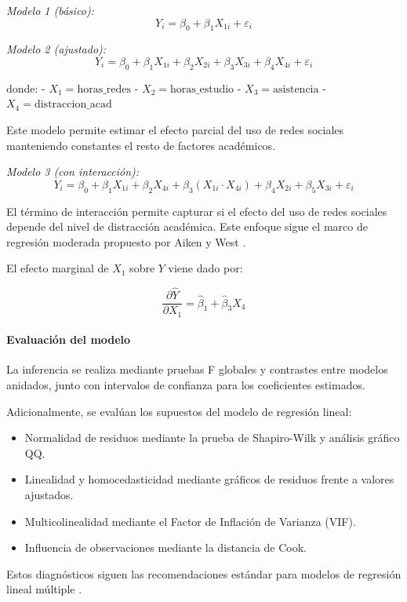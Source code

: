 \documentclass[12pt]{article}
\begin{document}
\textit{Modelo 1 (básico):}
\[
Y_i = \beta_0 + \beta_1 X_{1i} + \varepsilon_i
\]

\textit{Modelo 2 (ajustado):}
\[
Y_i = \beta_0 + \beta_1 X_{1i} + \beta_2 X_{2i} + \beta_3 X_{3i} + \beta_4 X_{4i} + \varepsilon_i
\]

donde:
- \(X_1 = \text{horas\_redes}\)
- \(X_2 = \text{horas\_estudio}\)
- \(X_3 = \text{asistencia}\)
- \(X_4 = \text{distraccion\_acad}\)

Este modelo permite estimar el efecto parcial del uso de redes sociales manteniendo constantes el resto de factores académicos.

\textit{Modelo 3 (con interacción):}
\[
Y_i = \beta_0 + \beta_1 X_{1i} + \beta_2 X_{4i} + \beta_3 (X_{1i} \cdot X_{4i}) + \beta_4 X_{2i} + \beta_5 X_{3i} + \varepsilon_i
\]

El término de interacción permite capturar si el efecto del uso de redes sociales depende del nivel de distracción académica. Este enfoque sigue el marco de regresión moderada propuesto por Aiken y West \cite{aikenwest1991}.

El efecto marginal de \(X_1\) sobre \(Y\) viene dado por:

\[
\frac{\partial \hat{Y}}{\partial X_1} = \hat\beta_1 + \hat\beta_3 X_4
\]

\paragraph{Evaluación del modelo}

La inferencia se realiza mediante pruebas F globales y contrastes entre modelos anidados, junto con intervalos de confianza para los coeficientes estimados.

Adicionalmente, se evalúan los supuestos del modelo de regresión lineal:

\begin{itemize}
\item Normalidad de residuos mediante la prueba de Shapiro-Wilk y análisis gráfico QQ.
\item Linealidad y homocedasticidad mediante gráficos de residuos frente a valores ajustados.
\item Multicolinealidad mediante el Factor de Inflación de Varianza (VIF).
\item Influencia de observaciones mediante la distancia de Cook.
\end{itemize}

Estos diagnósticos siguen las recomendaciones estándar para modelos de regresión lineal múltiple \cite{kutner2005}.
\end{document}

